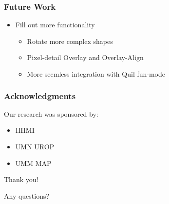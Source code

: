\documentclass{beamer}
\begin{document}
\begin{frame}
	\frametitle{Future Work}
	\begin{itemize}
		\item Fill out more functionality
		\begin{itemize}
			\item Rotate more complex shapes
			\item Pixel-detail Overlay and Overlay-Align
			\item More seemless integration with Quil fun-mode
		\end{itemize}
	\end{itemize}
\end{frame}




\begin{frame}
\frametitle{Acknowledgments}
	Our research was sponsored by:
	\begin{itemize}
	\item HHMI
	\item UMN UROP
	\item UMM MAP
	\end{itemize}
	{\centering
	\noindent
	Thank you! \par
	Any questions? \par
	}
\end{frame}
\end{document}

